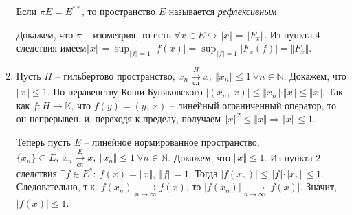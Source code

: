 \begin{example}
\begin{enumerate}
\begin{definition}
            Если $\displaystyle \pi E=E^{**}$, то пространство $\displaystyle E$ называется \textit{рефлексивным}.
        \end{definition}
        Докажем, что $\displaystyle \pi $ -- изометрия, то есть $\displaystyle \forall x\in E\hookrightarrow \Vert x\Vert =\Vert F_{x}\Vert $. Из пункта 4 следствия имеем$\displaystyle \Vert x\Vert =\sup _{\Vert f\Vert =1}| f( x)| =\sup _{\Vert f\Vert =1}| F_{x}( f)| =\Vert F_{x}\Vert $.
        \item Пусть $\displaystyle H$ -- гильбертово пространство, $\displaystyle x_{n}\xrightarrow[\text{сл}]{H} x,\ \Vert x_{n}\Vert \leqslant 1\ \forall n\in \mathbb{N}$. Докажем, что $\displaystyle \Vert x\Vert \leqslant 1$. По неравенству Коши-Буняковского $\displaystyle | ( x_{n} ,\ x)| \leqslant \Vert x_{n}\Vert \cdotp \Vert x\Vert \leqslant \Vert x\Vert $. Так как $\displaystyle f:H\rightarrow \mathbb{K}$, что $\displaystyle f( y) =( y,\ x)$ -- линейный ограниченный оператор, то он непрерывен, и, переходя к пределу, получаем $\displaystyle \Vert x\Vert ^{2} \leqslant \Vert x\Vert \Rightarrow \Vert x\Vert \leqslant 1$.
    
        Теперь пусть $\displaystyle E$ -- линейное нормированное пространство, $\displaystyle \{x_{n}\} \subset E,\ x_{n}\xrightarrow[\text{сл}]{E} x,\ \Vert x_{n}\Vert \leqslant 1\ \forall n\in \mathbb{N}$. Докажем, что $\displaystyle \Vert x\Vert \leqslant 1$. Из пункта 2 следствия $\displaystyle \exists f\in E^{*} :\ f( x) =\Vert x\Vert ,\ \Vert f\Vert =1$. Тогда $\displaystyle | f( x_{n})| \leqslant \Vert f\Vert \cdotp \Vert x_{n}\Vert \leqslant 1$. Следовательно, т.к. $\displaystyle f( x_{n})\xrightarrow[n\rightarrow \infty ]{} f( x)$, то $\displaystyle | f( x_{n})| \xrightarrow[n\rightarrow \infty ]{}| f( x)| $. Значит, $\displaystyle | f( x)| \leqslant 1$.
    \end{enumerate}
\end{example}
